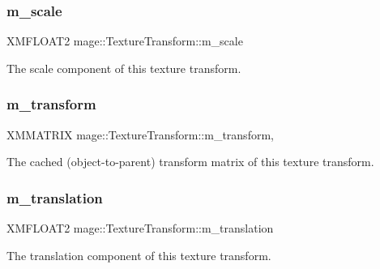 \subsubsection{\texorpdfstring{m\+\_\+scale}{m\_scale}}
{\footnotesize\ttfamily X\+M\+F\+L\+O\+A\+T2 mage\+::\+Texture\+Transform\+::m\+\_\+scale\hspace{0.3cm}{\ttfamily [private]}}

The scale component of this texture transform. \hypertarget{structmage_1_1_texture_transform_ad801f906833544ca476908c241945ed6}{}\label{structmage_1_1_texture_transform_ad801f906833544ca476908c241945ed6} 
\subsubsection{\texorpdfstring{m\+\_\+transform}{m\_transform}}
{\footnotesize\ttfamily X\+M\+M\+A\+T\+R\+IX mage\+::\+Texture\+Transform\+::m\+\_\+transform\hspace{0.3cm}{\ttfamily [mutable]}, {\ttfamily [private]}}

The cached (object-\/to-\/parent) transform matrix of this texture transform. \hypertarget{structmage_1_1_texture_transform_a6b468f62dc90f84bbf877192ff167c22}{}\label{structmage_1_1_texture_transform_a6b468f62dc90f84bbf877192ff167c22} 
\subsubsection{\texorpdfstring{m\+\_\+translation}{m\_translation}}
{\footnotesize\ttfamily X\+M\+F\+L\+O\+A\+T2 mage\+::\+Texture\+Transform\+::m\+\_\+translation\hspace{0.3cm}{\ttfamily [private]}}

The translation component of this texture transform. 